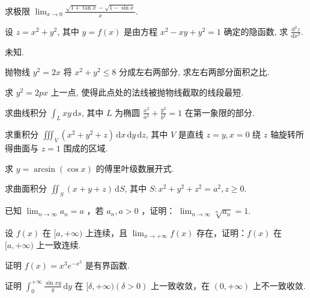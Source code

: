 求极限 $\lim_{x\to 0}\frac{\sqrt{1 + \tan x} - \sqrt{1 - \sin x}}{x}$.\par
设 $z = x^{2} + y^{2}$, 其中 $y = f(x)$ 是由方程 $x^{2} - xy + y^{2} = 1$ 确定的隐函数, 求 $\frac{\mathrm{d}^2z}{\mathrm{d}x^2}$.\par
未知.\par
抛物线 $y^{2} = 2x$ 将 $x^{2} + y^{2} \leq 8$ 分成左右两部分, 求左右两部分面积之比.\par
求 $y^{2} = 2px$ 上一点, 使得此点处的法线被抛物线截取的线段最短.\par
求曲线积分 $\int_{L} xy \, \mathrm{d}s$, 其中 $L$ 为椭圆 $\frac{x^2}{a^2} + \frac{y^2}{b^2} = 1$ 在第一象限的部分.\par
求重积分 $\iiint_{V} (x^{2} + y^{2} + z) \, \mathrm{d}x \, \mathrm{d}y \, \mathrm{d}z$, 其中 $V$ 是直线 $z = y, x = 0$ 绕 $z$ 轴旋转所得曲面与 $z = 1$ 围成的区域.\par
求  $y = \arcsin(\cos x)$  的傅里叶级数展开式.\par
求曲面积分 $\iint_{S} (x + y + z) \, \mathrm{d}S$, 其中 $S: x^{2} + y^{2} + z^{2} = a^{2}, z \geq 0$.\par
已知 $\lim_{n\to \infty}a_n = a$ ，若 $a_{n},a > 0$ ，证明： $\lim_{n\to \infty}\sqrt[n]{a_n} = 1.$\par
设 $f(x)$ 在 $[a, +\infty)$ 上连续，且 $\lim_{x \to +\infty} f(x)$ 存在，证明：$f(x)$ 在 $[a, +\infty)$ 上一致连续.\par
证明 $f(x) = x^3 e^{-x^2}$ 是有界函数.\par
证明 $\int_0^{+\infty} \frac{\sin xy}{y} \, \mathrm{d}y$ 在 $[\delta, +\infty) (\delta > 0)$ 上一致收敛，在 $(0, +\infty)$ 上不一致收敛.\par
